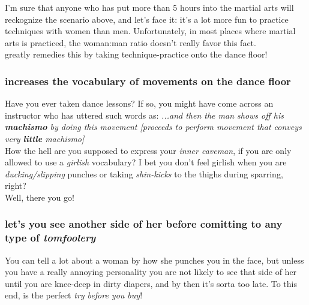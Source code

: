 I'm sure that anyone who has put more than 5 hours into the martial arts will reckognize the scenario above, and let's face it: it's a lot more fun to practice techniques with women than men. Unfortunately, in most places where martial arts is practiced, the woman:man ratio doesn't really favor this fact.\\
\sovs greatly remedies this by taking technique-practice onto the dance floor! 

\newpage
\subsubsection*{\sovs increases the vocabulary of movements on the dance floor}
Have you ever taken dance lessons? If so, you might have come across an instructor who has uttered such words as: \textit{...and then the man shows off his \textbf{machismo} by doing this movement [proceeds to perform movement that conveys very \textbf{little} machismo]}\\
How the hell are you supposed to express your \textit{inner caveman}, if you are only allowed to use a \textit{girlish} vocabulary? I bet you don't feel girlish when you are \textit{ducking/slipping} punches or taking \textit{shin-kicks} to the thighs during sparring, right?\\ 
Well, there you go!

\subsubsection*{\sovs let's you see another side of her before comitting to any type of \textit{tomfoolery}}
You can tell a lot about a woman by how she punches you in the face, but unless you have a really annoying personality you are not likely to see that side of her until you are knee-deep in dirty diapers, and by then it's sorta too late. To this end, \sovs is the perfect \textit{try before you buy}!

